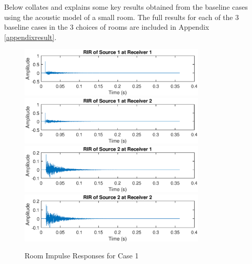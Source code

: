 \documentclass[a4paper,twoside,12pt,hidelinks]{article}
\begin{document}
Below collates and explains some key results obtained from the baseline cases using the acoustic model of a small room. The full results for each of the 3 baseline cases in the 3 choices of rooms are included in Appendix \ref{appendixresult}.

\begin{figure}[H]
\centering
\includegraphics[width=0.8\textwidth]{c1s1r1}
\includegraphics[width=0.8\textwidth]{c1s1r2}
\includegraphics[width=0.8\textwidth]{c1s2r1}
\includegraphics[width=0.8\textwidth]{c1s2r2}
\caption{Room Impulse Responses for Case 1}
\label{fig:case1}
\end{figure}
\end{document}
